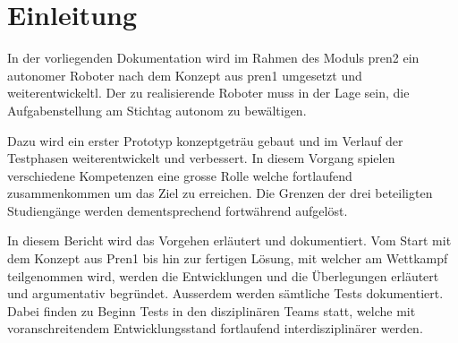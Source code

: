 \section{Einleitung}

In der vorliegenden Dokumentation wird im Rahmen des Moduls \acrfull{pren2} ein autonomer Roboter nach dem Konzept aus \acrfull{pren1} umgesetzt und weiterentwickeltl. Der zu realisierende Roboter muss in der Lage sein, die Aufgabenstellung am Stichtag autonom zu bewältigen.

Dazu wird ein erster Prototyp konzeptgeträu gebaut und im Verlauf der Testphasen weiterentwickelt und verbessert. In diesem Vorgang spielen verschiedene Kompetenzen eine grosse Rolle welche fortlaufend zusammenkommen um das Ziel zu erreichen. Die Grenzen der drei beteiligten Studiengänge werden dementsprechend fortwährend aufgelöst.

In diesem Bericht wird das Vorgehen erläutert und dokumentiert. Vom Start mit dem Konzept aus Pren1 bis hin zur fertigen Lösung, mit welcher am Wettkampf teilgenommen wird, werden die Entwicklungen und die Überlegungen erläutert und argumentativ begründet. Ausserdem werden sämtliche Tests dokumentiert. Dabei finden zu Beginn Tests in den disziplinären Teams statt, welche mit voranschreitendem Entwicklungsstand fortlaufend interdisziplinärer werden.

